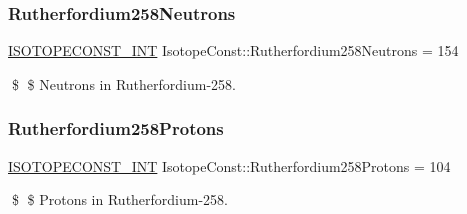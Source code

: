 \subsubsection{\texorpdfstring{Rutherfordium258\+Neutrons}{Rutherfordium258Neutrons}}
{\footnotesize\ttfamily \mbox{\hyperlink{group___isotope_const-_macros_ga5f18360b3e99483a35c32d789e62621c}{I\+S\+O\+T\+O\+P\+E\+C\+O\+N\+S\+T\+\_\+\+I\+NT}} Isotope\+Const\+::\+Rutherfordium258\+Neutrons = 154}

\$ \$ Neutrons in Rutherfordium-\/258. \mbox{\label{group___isotope_const-_rutherfordium-_rf258_ga42791ccade2b7152b17a37f98e66a0cf}} 
\subsubsection{\texorpdfstring{Rutherfordium258\+Protons}{Rutherfordium258Protons}}
{\footnotesize\ttfamily \mbox{\hyperlink{group___isotope_const-_macros_ga5f18360b3e99483a35c32d789e62621c}{I\+S\+O\+T\+O\+P\+E\+C\+O\+N\+S\+T\+\_\+\+I\+NT}} Isotope\+Const\+::\+Rutherfordium258\+Protons = 104}

\$ \$ Protons in Rutherfordium-\/258. 